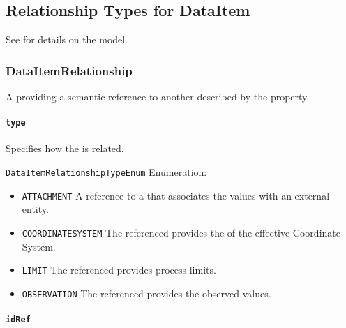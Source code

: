 \subsection{Relationship Types for DataItem} \label{sec:Relationship Types for DataItem}


See  for details on the  model.


\subsubsection{DataItemRelationship}
\label{sec:DataItemRelationship}



A  providing a semantic reference to another  described by the  property.


\paragraph{\texttt{type}}\mbox{}
\label{sec:type}

\newline Specifies how the  is related.

\texttt{DataItemRelationshipTypeEnum} Enumeration:

\begin{itemize}
\item \texttt{ATTACHMENT} \newline A reference to a  that associates the values with an external entity.
 
\item \texttt{COORDINATE\textunderscore SYSTEM} \newline  The referenced  provides the  of the effective Coordinate System.
 
\item \texttt{LIMIT} \newline The referenced  provides process limits.
 
\item \texttt{OBSERVATION} \newline The referenced  provides the observed values.
 
\end{itemize}


\paragraph{\texttt{idRef}}\mbox{}
\label{sec:idRef}

